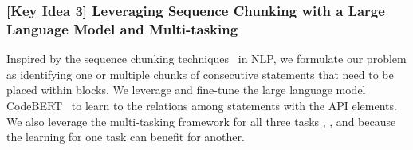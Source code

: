 

\subsubsection{{\bf [Key Idea 3] Leveraging Sequence Chunking with a Large Language Model and Multi-tasking}} 
Inspired by the sequence chunking
techniques~\cite{sequence-chunking-aaai17} in NLP, we formulate our
problem as identifying one or multiple chunks of consecutive
statements that need to be placed within  blocks. We
leverage and fine-tune the large language model
CodeBERT~\cite{codebert-emnlp20} to learn to the relations among
statements with the API elements.  We also leverage the multi-tasking
framework for all three tasks {\xblock}, {\xstate}, and {\xtype}
because the learning for one task can benefit for another.

